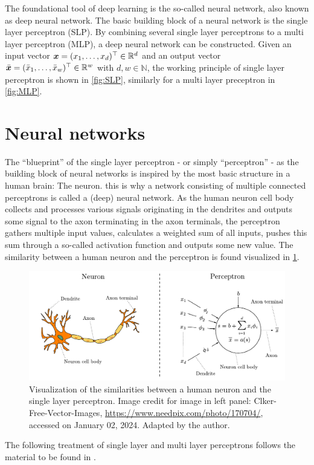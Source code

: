 \documentclass[a4paper,11pt]{report}
\def\lk#1{{\color{black}{#1}}}
\begin{document}
The foundational tool of deep learning is the so-called neural network, also known as deep neural network. The basic building block of a neural network is the single layer perceptron (SLP). By combining several single layer perceptrons to a multi layer perceptron (MLP), a deep neural network can be constructed. Given an input vector $\bm{x} = (x_1, \dots, x_d)^\top \in\mathbb{R}^d$ and an output vector $\bar{\bm{x}} = (\bar{x}_1,\dots,\bar{x}_w)^\top \in \mathbb{R}^w$ with $d,w \in \mathbb{N}$, the working principle of \lk{a} single layer perceptron is shown in \cref{fig:SLP}, similarly for a multi layer preceptron in \cref{fig:MLP}.

\section{Neural networks}
The ``blueprint'' of the single layer perceptron - or simply ``perceptron'' - as the building block of neural networks is inspired by the most basic structure in a human brain: The neuron. this is why a network consisting of multiple connected perceptrons is called a (deep) neural network. As the human neuron cell body collects and processes various signals originating in the dendrites and outputs some signal to the axon terminating in the axon terminals, the perceptron gathers multiple input values, calculates a weighted sum of all inputs, pushes this sum through a so-called activation function and outputs some new value. The similarity between a human neuron and the perceptron is found visualized in \cref{fig:neuronperceptron}. 
\begin{figure}[h]
\centering
\includegraphics[width=\textwidth]{figures/neuronperceptron.pdf}
\cprotect\caption{Visualization of the similarities between a human neuron and the single layer perceptron. Image credit for image in left panel: Clker-Free-Vector-Images, \url{https://www.needpix.com/photo/170704/}, accessed on January 02, 2024. Adapted by the author.}
\label{fig:neuronperceptron}
\end{figure}
The following treatment of single layer and multi layer perceptrons follows the material to be found in \cite[p.338-342]{Raschka.2022}.
\end{document}
